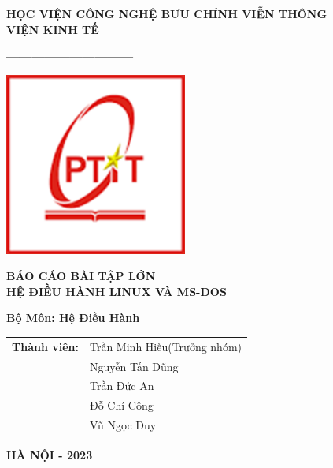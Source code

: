 \documentclass[12pt,a4paper]{article}
\begin{document}
\begin{titlepage}
	\begin{tcolorbox}[colback=white, colframe=black, width=\textwidth, height=\textheight,  boxsep=1em]
		\centering
		\vspace*{0.2cm}
		{\fontsize{15}{0} \textbf{HỌC VIỆN CÔNG NGHỆ BƯU CHÍNH VIỄN THÔNG\\VIỆN KINH TẾ}}
		
		\vspace{0.01cm}
		{\fontsize{15}{14} \textbf{------------------------------}}
		\vspace{0.8cm}
	
		\includegraphics[width=6cm]{img/logo.png} 
		
		\vspace{1cm}
			{\fontsize{18}{14} \textbf{BÁO CÁO BÀI TẬP LỚN\\HỆ ĐIỀU HÀNH LINUX VÀ MS-DOS}}
		
		\vspace{0.2cm}
		{\fontsize{18}{14} \textbf{Bộ Môn: Hệ Điều Hành}}
		
		\vspace{2cm}
		\begin{tabular}{ll}
			{\fontsize{15}{0} \textbf{Thành viên:}} 
			& {\fontsize{14}{14}\selectfont Trần Minh Hiếu(Trưởng nhóm)}\\
			& {\fontsize{14}{14}\selectfont Nguyễn Tấn Dũng} \\
			& {\fontsize{14}{14}\selectfont Trần Đức An} \\
			& {\fontsize{14}{14}\selectfont Đỗ Chí Công} \\
			& {\fontsize{14}{14}\selectfont Vũ Ngọc Duy} \\
		\end{tabular}
		
		\vspace{5.7cm}
		{\fontsize{15}{14} \textbf{HÀ NỘI - 2023}}
		
		
	\end{tcolorbox}
\end{titlepage}
\end{document}
